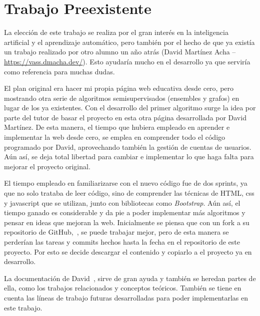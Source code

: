 \section{Trabajo Preexistente}
La elección de este trabajo se realiza por el gran interés en la inteligencia artificial y el aprendizaje automático, pero también por el hecho de que ya existía un trabajo realizado por otro alumno un año atrás (David Martínez Acha -- \url{https://vass.dmacha.dev/}). Esto ayudaría mucho en el desarrollo ya que serviría como referencia para muchas dudas.

El plan original era hacer mi propia página web educativa desde cero, pero mostrando otra serie de algoritmos semisupervisados (ensembles y grafos) en lugar de los ya existentes. Con el desarrollo del primer algoritmo surge la idea por parte del tutor de basar el proyecto en esta otra página desarrollada por David Martínez. De esta manera, el tiempo que hubiera empleado en aprender e implementar la web desde cero, se emplea en comprender todo el código programado por David, aprovechando también la gestión de cuentas de usuarios. Aún así, se deja total libertad para cambiar e implementar lo que haga falta para mejorar el proyecto original.

El tiempo empleado en familiarizarse con el nuevo código fue de dos sprints, ya que no solo trataba de leer código, sino de comprender las técnicas de HTML, css y javascript que se utilizan, junto con bibliotecas como \textit{Bootstrap}.
Aún así, el tiempo ganado es considerable y da pie a poder implementar más algoritmos y pensar en ideas que mejoran la web.
Inicialmente se piensa que con un fork a su repositorio de GitHub,~\cite{GH:VASS}, se puede trabajar mejor, pero de esta manera se perderían las tareas y commits hechos hasta la fecha en el repositorio de este proyecto. Por esto se decide descargar el contenido y copiarlo a el proyecto ya en desarrollo.

La documentación de David~\cite{TFG:David}, sirve de gran ayuda y también se heredan partes de ella, como los trabajos relacionados y conceptos teóricos. También se tiene en cuenta las líneas de trabajo futuras desarrolladas para poder implementarlas en este trabajo.

